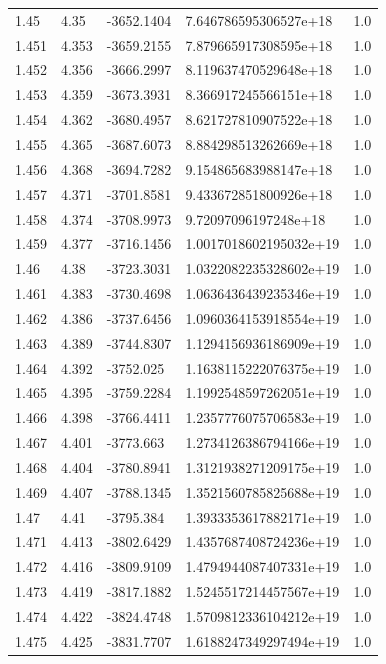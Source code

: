\begin{tabular}{lllll}
1.45 & 4.35 & -3652.1404 & 7.646786595306527e+18 & 1.0 \\
1.451 & 4.353 & -3659.2155 & 7.879665917308595e+18 & 1.0 \\
1.452 & 4.356 & -3666.2997 & 8.119637470529648e+18 & 1.0 \\
1.453 & 4.359 & -3673.3931 & 8.366917245566151e+18 & 1.0 \\
1.454 & 4.362 & -3680.4957 & 8.621727810907522e+18 & 1.0 \\
1.455 & 4.365 & -3687.6073 & 8.884298513262669e+18 & 1.0 \\
1.456 & 4.368 & -3694.7282 & 9.154865683988147e+18 & 1.0 \\
1.457 & 4.371 & -3701.8581 & 9.433672851800926e+18 & 1.0 \\
1.458 & 4.374 & -3708.9973 & 9.72097096197248e+18 & 1.0 \\
1.459 & 4.377 & -3716.1456 & 1.0017018602195032e+19 & 1.0 \\
1.46 & 4.38 & -3723.3031 & 1.0322082235328602e+19 & 1.0 \\
1.461 & 4.383 & -3730.4698 & 1.0636436439235346e+19 & 1.0 \\
1.462 & 4.386 & -3737.6456 & 1.0960364153918554e+19 & 1.0 \\
1.463 & 4.389 & -3744.8307 & 1.1294156936186909e+19 & 1.0 \\
1.464 & 4.392 & -3752.025 & 1.1638115222076375e+19 & 1.0 \\
1.465 & 4.395 & -3759.2284 & 1.1992548597262051e+19 & 1.0 \\
1.466 & 4.398 & -3766.4411 & 1.2357776075706583e+19 & 1.0 \\
1.467 & 4.401 & -3773.663 & 1.2734126386794166e+19 & 1.0 \\
1.468 & 4.404 & -3780.8941 & 1.3121938271209175e+19 & 1.0 \\
1.469 & 4.407 & -3788.1345 & 1.3521560785825688e+19 & 1.0 \\
1.47 & 4.41 & -3795.384 & 1.3933353617882171e+19 & 1.0 \\
1.471 & 4.413 & -3802.6429 & 1.4357687408724236e+19 & 1.0 \\
1.472 & 4.416 & -3809.9109 & 1.4794944087407331e+19 & 1.0 \\
1.473 & 4.419 & -3817.1882 & 1.5245517214457567e+19 & 1.0 \\
1.474 & 4.422 & -3824.4748 & 1.5709812336104212e+19 & 1.0 \\
1.475 & 4.425 & -3831.7707 & 1.6188247349297494e+19 & 1.0 \\

\end{tabular}
